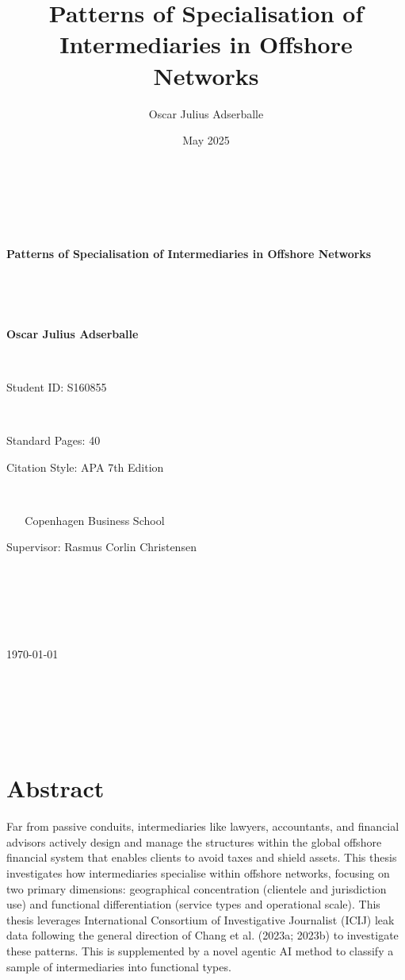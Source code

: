 \documentclass[12pt, a4paper]{report}
\title{Patterns of Specialisation of Intermediaries in Offshore Networks}
\author{Oscar Julius Adserballe}
\date{May 2025}
\begin{document}
\begin{titlepage}
    \centering
    \vspace*{1cm} 

    {\Huge\bfseries Patterns of Specialisation of Intermediaries in Offshore Networks\par}

    \vspace{1.5cm}

    {\Large\bfseries Oscar Julius Adserballe\par} 
    {\large Student ID: S160855\par} 

    \vspace{1cm}

    {\large Standard Pages: 40\par} 
    {\large Citation Style: APA 7th Edition\par} 

    \vspace{1cm}

    {\large Copenhagen Business School} 
    {\large Supervisor: Rasmus Corlin Christensen\par} 

    \vspace{1cm}

    {\large \today\par} 

    \vfill 
\end{titlepage}

\pagestyle{plain}

\newpage
\tableofcontents 

\newpage
\listoffigures 

\newpage
\listoftables  

\newpage

\chapter*{Abstract}
\label{sec:abstract}
Far from passive conduits, intermediaries like lawyers, accountants, and financial advisors actively design and manage the structures within the global offshore financial system that enables clients to avoid taxes and shield assets. This thesis investigates how intermediaries specialise within offshore networks, focusing on two primary dimensions: geographical concentration (clientele and jurisdiction use) and functional differentiation (service types and operational scale). This thesis leverages International Consortium of Investigative Journalist (ICIJ) leak data following the general direction of Chang et al. (2023a; 2023b) to investigate these patterns. This is supplemented by a novel agentic AI method to classify a sample of intermediaries into functional types.
\end{document}
